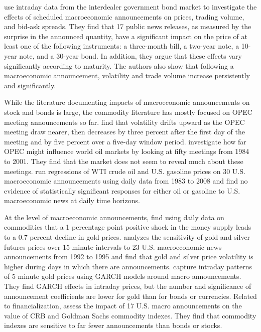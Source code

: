 \documentclass[12pt]{article}
\begin{document}
\citet{balduzzi2001economic}  use intraday data from the interdealer government bond market to investigate the effects of scheduled macroeconomic announcements on prices, trading volume, and bid-ask spreads. They find that 17 public news releases, as measured by the surprise in the announced quantity, have a significant impact on the price of at least one of the following instruments: a three-month bill, a two-year note, a 10-year note, and a 30-year bond. In addition, they argue that these effects vary significantly according to maturity. The authors also show that following a macroeconomic announcement, volatility and trade volume increase persistently and significantly.

While the literature documenting impacts of macroeconomic announcements on stock \citep{boyd2005stock,andersen2003micro,hu2017early,scholtus2014speed} and bonds \citep{fleming1997moves,fleming1999price,balduzzi2001economic} is large, the commodity literature has mostly focused on OPEC meeting announcements so far.  \citet{horan2004implied} find that volatility drifts upward as the OPEC meeting draw nearer, then decreases by three percent after the first day of the meeting and by five percent over a five-day window period. \citet{wirl2004impact} investigate how far OPEC might influence world oil markets by looking at fifty meetings from 1984 to 2001. They find that the market does not seem to reveal much about these meetings. \citet{kilian2011energy} run regressions of WTI crude oil and U.S. gasoline prices on 30 U.S. macroeconomic announcements using daily data from 1983 to 2008 and find no evidence of statistically significant responses for either oil or gasoline to U.S. macroeconomic news at daily time horizons.


At the level of macroeconomic announcements, \citet{frankel1985commodity} find using daily data on commodities that a 1 percentage point positive shock in the money supply leads to a 0.7 percent decline in gold prices. \citet{christie2000macroeconomics} analyzes the sensitivity of gold and silver futures prices over 15-minute intervals to 23 U.S. macroeconomic news announcements from 1992 to 1995 and find that gold and silver price volatility is higher during days in which there are announcements. \citet{cai2001moves} capture intraday patterns of 5 minute gold prices using GARCH models around macro announcements. They find GARCH effects in intraday prices, but the number and significance of announcement coefficients are lower for gold than for bonds or currencies. Related to financialization, \citet{hess2008commodity} assess the impact of 17 U.S. macro announcements on the value of CRB and Goldman Sachs commodity indexes. They find that commodity indexes are sensitive to far fewer announcements than bonds or stocks.
\end{document}
